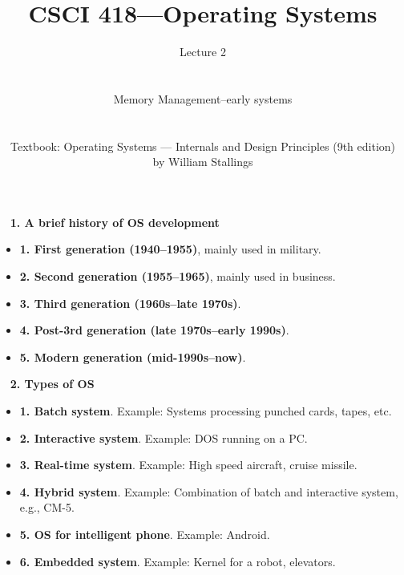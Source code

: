 \pagestyle{empty}
\title{CSCI 418---Operating Systems}
\author{ Lecture 2 \\
\\
\\
Memory Management--early systems\\
\\
\\
Textbook: Operating Systems --- Internals and Design Principles (9th edition)\\
by William Stallings}
\date{}

\newenvironment{slide}[1]{\clearpage
                         ~ \hfill {\bf #1}  \hfill ~\\ \begin{itemize}
                         }{\end{itemize}}
\Large
\maketitle



\begin{slide}{ 1. A brief history of OS development}
\item {\bf 1. First generation (1940--1955)}, mainly used in military.
\vspace{3cm}
\item {\bf 2. Second generation (1955--1965)}, mainly used in business.
\vspace{3cm}
\item {\bf 3. Third generation (1960s--late 1970s)}.
\vspace{3cm}
\item {\bf 4. Post-3rd generation (late 1970s--early 1990s)}.
\vspace{3cm}
\item {\bf 5. Modern generation (mid-1990s--now)}.
\end{slide}

\begin{slide}{ 2. Types of OS}
\item {\bf 1. Batch system}. Example: Systems processing punched cards, tapes, etc.
\vspace{2cm}
\item {\bf 2. Interactive system}. Example: DOS running on a PC.
\vspace{2cm}
\item {\bf 3. Real-time system}. Example: High speed aircraft, cruise missile.
\vspace{2cm}
\item {\bf 4. Hybrid system}. Example: Combination of batch and interactive system, e.g., CM-5.
\item {\bf 5. OS for intelligent phone}. Example: Android.
\vspace{2cm}
\item {\bf 6. Embedded system}. Example: Kernel for a robot, elevators.
\end{slide}


